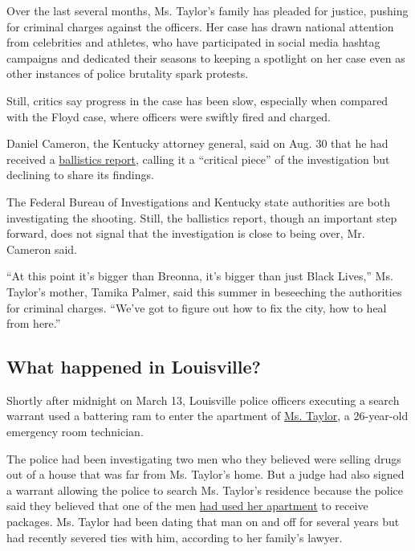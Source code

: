 Over the last several months, Ms. Taylor's family has pleaded for
justice, pushing for criminal charges against the officers. Her case has
drawn national attention from celebrities and athletes, who have
participated in social media hashtag campaigns and dedicated their
seasons to keeping a spotlight on her case even as other instances of
police brutality spark protests.

Still, critics say progress in the case has been slow, especially when
compared with the Floyd case, where officers were swiftly fired and
charged.

Daniel Cameron, the Kentucky attorney general, said on Aug. 30 that he
had received a
\href{https://www.nytimes3xbfgragh.onion/2020/08/30/us/breonna-taylor-shooting-ballistics.html}{ballistics
report}, calling it a ``critical piece'' of the investigation but
declining to share its findings.

The Federal Bureau of Investigations and Kentucky state authorities are
both investigating the shooting. Still, the ballistics report, though an
important step forward, does not signal that the investigation is close
to being over, Mr. Cameron said.

``At this point it's bigger than Breonna, it's bigger than just Black
Lives,'' Ms. Taylor's mother, Tamika Palmer, said this summer in
beseeching the authorities for criminal charges. ``We've got to figure
out how to fix the city, how to heal from here.''

\hypertarget{what-happened-in-louisville}{%
\subsection{What happened in
Louisville?}\label{what-happened-in-louisville}}

Shortly after midnight on March 13, Louisville police officers executing
a search warrant used a battering ram to enter the apartment of
\href{https://www.nytimes3xbfgragh.onion/2020/06/12/us/breonna-taylor-law-passed.html}{Ms.
Taylor}, a 26-year-old emergency room technician.

The police had been investigating two men who they believed were selling
drugs out of a house that was far from Ms. Taylor's home. But a judge
had also signed a warrant allowing the police to search Ms. Taylor's
residence because the police said they believed that one of the men
\href{https://www.courier-journal.com/story/news/2020/05/12/breonna-taylor-louisville-emt-not-main-target-drug-investigation/3115928001/}{had
used her apartment} to receive packages. Ms. Taylor had been dating that
man on and off for several years but had recently severed ties with him,
according to her family's lawyer.

